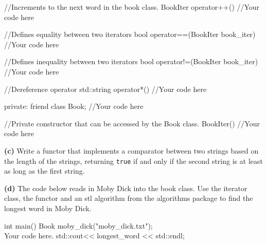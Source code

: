 \documentclass[12pt,letterpaper,twoside]{article}
\begin{document}
\begin{cpp}
{	
	//Increments to the next word in the book class.
	BookIter operator++()
	{
		//Your code here
	}
	
	//Defines equality between two iterators
	bool operator==(BookIter book_iter)
	{
		//Your code here		
	}
	
	//Defines inequality between two iterators
	bool operator!=(BookIter book_iter)
	{
		//Your code here		
	}
	
	//Dereference operator
	std::string operator*()
	{
		//Your code here			
	}
	
	
	private:
	friend class Book;
	//Your code here
	
	//Private constructor that can be accessed by the Book class.
	BookIter(){
		//Your code here
	}
}

\end{cpp}

\begin{solution}

\end{solution}
 
\textbf{(c)} Write a functor that implements a comparator between two strings based on the length of the strings, returning \texttt{true} if and only if the second string is at least as long as the first string.

\begin{solution}

\end{solution}

\textbf{(d)} The code below reads in Moby Dick into the book class. Use the iterator class, the functor and an stl algorithm from the algorithms package to find the longest word in Moby Dick.

\begin{cpp}
int main()
{
	Book moby_dick("moby_dick.txt");
	\\ Your code here.
	std::cout<< longest_word << std::endl;
}
\end{cpp}

\begin{solution}

\end{solution}
\end{document}
